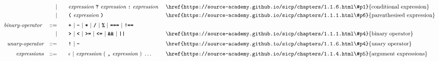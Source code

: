 \begin{alignat*}{9}
&&                       && |   &\quad &&   \textit{expression} \ \textbf{\texttt{?}}\ 
                                            \textit{expression}
                                            \ \textbf{\texttt{:}}\
                                            \textit{expression}\
                                                           && \textrm{\href{https://source-academy.github.io/sicp/chapters/1.1.6.html\#p1}{conditional expression}}\\
&&                       && |   &\quad &&  \textbf{\texttt{(}}\  \textit{expression} \ 
                                            \textbf{\texttt{)}} && \textrm{\href{https://source-academy.github.io/sicp/chapters/1.1.1.html\#p6}{parenthesised expression}}\\[1mm]
&& \textit{binary-operator}    \ 
                        && ::= &\quad && \textbf{\texttt{+}}\ |\ \textbf{\texttt{-}}\ |\ \textbf{\texttt{*}}\ |\ \textbf{\texttt{/}}\ |\ \textbf{\texttt{\%}}\ |\ 
                                   \textbf{\texttt{===}}\ |\ \textbf{\texttt{!==}}\ \\
&&                       && |  &\quad &&  \texttt{\textbf{>}}\ |\ \texttt{\textbf{<}}\ |\ \texttt{\textbf{>=}}\ |\ \texttt{\textbf{<=}}\
                                          |\ \textbf{\texttt{\&\&}}\ |\ \texttt{\textbf{||}}
                                          && \textrm{\href{https://source-academy.github.io/sicp/chapters/1.1.1.html\#p4}{binary operator}}\\[1mm]
&& \textit{unary-operator}    
                        && ::= &\quad && \textbf{\texttt{!}}\ |\ \textbf{\texttt{-}}
                        && \textrm{\href{https://source-academy.github.io/sicp/chapters/1.1.6.html\#p4}{unary operator}}\\[1mm]
&& \textit{expressions}  && ::= &\quad && \epsilon\ | \ \textit{expression}\ (
                                                               \ \textbf{\texttt{,}} \
                                                                 \textit{expression} \ 
                                                                      )\ \ldots
                                                            && \textrm{\href{https://source-academy.github.io/sicp/chapters/1.1.4.html\#p5}{argument expressions}} 
\end{alignat*}

